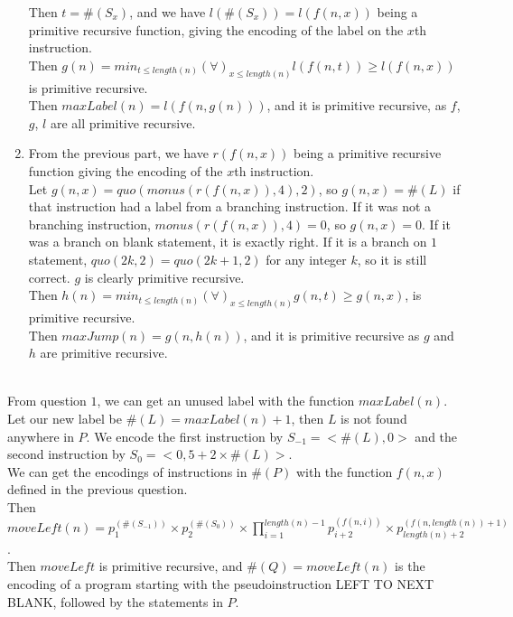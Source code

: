 \documentclass{assignment}
\begin{document}
\begin{problemlist}
\begin{answer}
\begin{enumerate}
      Then $t=\#(S_x)$, and we have $l(\#(S_x))=l(f(n,x))$ being a primitive recursive function, giving the encoding of the label on the $x$th instruction.\\
      Then $g(n)=min_{t\le length(n)} (\forall)_{x\le length(n)} l(f(n,t))\ge l(f(n,x))$ is primitive recursive.\\
      Then $maxLabel(n)=l(f(n,g(n)))$, and it is primitive recursive, as $f$, $g$, $l$ are all primitive recursive.\\
      \clearpage
    \item
      From the previous part, we have $r(f(n,x))$ being a primitive recursive function giving the encoding of the $x$th instruction.\\
      Let $g(n,x)=quo(monus(r(f(n,x)),4),2)$, so $g(n,x)=\#(L)$ if that instruction had a label from a branching instruction. If it was not a branching instruction, $monus(r(f(n,x)),4)=0$, so $g(n,x)=0$. If it was a branch on blank statement, it is exactly right. If it is a branch on $1$ statement, $quo(2k,2)=quo(2k+1,2)$ for any integer $k$, so it is still correct. $g$ is clearly primitive recursive.\\
      Then $h(n)=min_{t\le length(n)} (\forall)_{x\le length(n)} g(n,t)\ge g(n,x)$, is primitive recursive.\\
      Then $maxJump(n)=g(n,h(n))$, and it is primitive recursive as $g$ and $h$ are primitive recursive.\\
    \end{enumerate}
  \end{answer}

  \pbitem
  \begin{problem}
  \end{problem}
  \begin{answer}
    \\
    From question $1$, we can get an unused label with the function $maxLabel(n)$. Let our new label be $\#(L)=maxLabel(n)+1$, then $L$ is not found anywhere in $P$. We encode the first instruction by $S_{-1}=<\#(L),0>$ and the second instruction by $S_0=<0,5+2\times \#(L)>$.\\
    We can get the encodings of instructions in $\#(P)$ with the function $f(n,x)$ defined in the previous question.\\
    Then $moveLeft(n)=p_1^{(\#(S_{-1}))}\times p_2^{(\#(S_{0}))}\times \prod_{i=1}^{length(n)-1}p_{i+2}^{(f(n,i))} \times p_{length(n)+2}^{(f(n,length(n))+1)}$.\\
    Then $moveLeft$ is primitive recursive, and $\#(Q)=moveLeft(n)$ is the encoding of a program starting with the pseudoinstruction LEFT TO NEXT BLANK, followed by the statements in $P$.\\
  \end{answer}


\end{problemlist}
\end{document}
